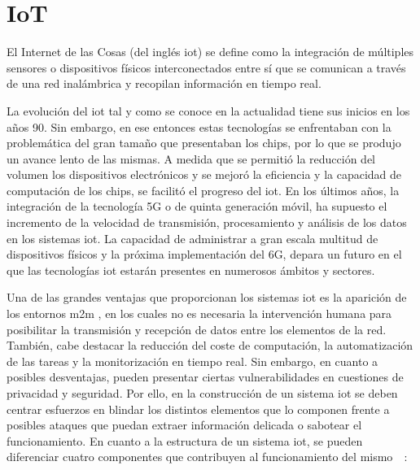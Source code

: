\section{IoT}
\label{sec:iot}

El Internet de las Cosas (del inglés \acrfull{iot}) \cite{iot} \cite{iotamazon} se define como la integración de múltiples sensores o dispositivos físicos interconectados entre sí que se comunican a través de una red inalámbrica y recopilan información en tiempo real. 

\vspace{3mm}

La evolución del \gls{iot} tal y como se conoce en la actualidad tiene sus inicios en los años 90. Sin embargo, en ese entonces estas tecnologías se enfrentaban con la problemática del gran tamaño que presentaban los chips, por lo que se produjo un avance lento de las mismas. A medida que se permitió la reducción del volumen los dispositivos electrónicos y se mejoró la eficiencia y la capacidad de computación de los chips, se facilitó el progreso del \gls{iot}. En los últimos años, la integración de la tecnología 5G o de quinta generación móvil, ha supuesto el incremento de la velocidad de transmisión, procesamiento y análisis de los datos en los sistemas \gls{iot}. La capacidad de administrar a gran escala multitud de dispositivos físicos y la próxima implementación del 6G, depara un futuro en el que las tecnologías \gls{iot} estarán presentes en numerosos ámbitos y sectores.

\vspace{3mm}

Una de las grandes ventajas que proporcionan los sistemas \gls{iot} es la aparición de los entornos \gls{m2m} \cite{m2m}, en los cuales no es necesaria la intervención humana para posibilitar la transmisión y recepción de datos entre los elementos de la red. También, cabe destacar la reducción del coste de computación, la automatización de las tareas y la monitorización en tiempo real. Sin embargo, en cuanto a posibles desventajas, pueden presentar ciertas vulnerabilidades en cuestiones de privacidad y seguridad. Por ello, en la construcción de un sistema \gls{iot} se deben centrar esfuerzos en blindar los distintos elementos que lo componen frente a posibles ataques que puedan extraer información delicada o sabotear el funcionamiento. En cuanto a la estructura de un sistema \gls{iot}, se pueden diferenciar cuatro componentes que contribuyen al funcionamiento del mismo~\cite{iot}~\cite{iotamazon}:


